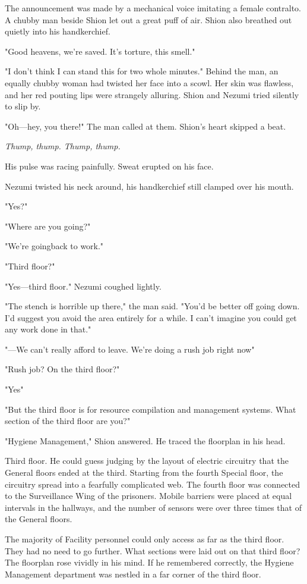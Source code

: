 The announcement was made by a mechanical voice imitating a female
contralto. A chubby man beside Shion let out a great puff of air. Shion
also breathed out quietly into his handkerchief.

"Good heavens, we're saved. It's torture, this smell."

"I don't think I can stand this for two whole minutes." Behind the man,
an equally chubby woman had twisted her face into a scowl. Her skin was
flawless, and her red pouting lips were strangely alluring. Shion and
Nezumi tried silently to slip by.

"Oh---hey, you there!" The man called at them. Shion's heart skipped a
beat.

\emph{Thump, thump. Thump, thump.}

His pulse was racing painfully. Sweat erupted on his face.

Nezumi twisted his neck around, his handkerchief still clamped over his
mouth.

"Yes?"

"Where are you going?"

"We're going\el back to work."

"Third floor?"

"Yes---third floor." Nezumi coughed lightly.

"The stench is horrible up there," the man said. "You'd be better off
going down. I'd suggest you avoid the area entirely for a while. I can't
imagine you could get any work done in that."

"---We can't really afford to leave. We're doing a rush job right now\el "

"Rush job? On the third floor?"

"Yes\el "

"But the third floor is for resource compilation and management systems.
What section of the third floor are you?"

"Hygiene Management," Shion answered. He traced the floorplan in his
head.

Third floor. He could guess judging by the layout of electric circuitry
that the General floors ended at the third. Starting from the fourth
Special floor, the circuitry spread into a fearfully complicated web.
The fourth floor was connected to the Surveillance Wing of the
prisoners. Mobile barriers were placed at equal intervals in the
hallways, and the number of sensors were over three times that of the
General floors.

The majority of Facility personnel could only access as far as the third
floor. They had no need to go further. What sections were laid out on
that third floor? The floorplan rose vividly in his mind. If he
remembered correctly, the Hygiene Management department was nestled in a
far corner of the third floor.

